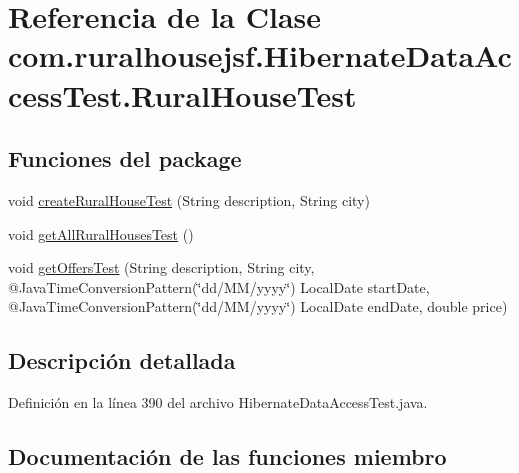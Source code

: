 \hypertarget{classcom_1_1ruralhousejsf_1_1_hibernate_data_access_test_1_1_rural_house_test}{}\section{Referencia de la Clase com.\+ruralhousejsf.\+Hibernate\+Data\+Access\+Test.\+Rural\+House\+Test}
\label{classcom_1_1ruralhousejsf_1_1_hibernate_data_access_test_1_1_rural_house_test}
\subsection*{Funciones del \textquotesingle{}package\textquotesingle{}}
\begin{DoxyCompactItemize}
\item 
void \mbox{\hyperlink{classcom_1_1ruralhousejsf_1_1_hibernate_data_access_test_1_1_rural_house_test_a34ac80f29a8ab5743e37e7f2e78db5e8}{create\+Rural\+House\+Test}} (String description, String city)
\item 
void \mbox{\hyperlink{classcom_1_1ruralhousejsf_1_1_hibernate_data_access_test_1_1_rural_house_test_abe3f39b2ef888c3f2b16d399c3d01f66}{get\+All\+Rural\+Houses\+Test}} ()
\item 
void \mbox{\hyperlink{classcom_1_1ruralhousejsf_1_1_hibernate_data_access_test_1_1_rural_house_test_a1f307f98016263fa520eefc8520ed5d2}{get\+Offers\+Test}} (String description, String city, @Java\+Time\+Conversion\+Pattern(\char`\"{}dd/MM/yyyy\char`\"{}) Local\+Date start\+Date, @Java\+Time\+Conversion\+Pattern(\char`\"{}dd/MM/yyyy\char`\"{}) Local\+Date end\+Date, double price)
\end{DoxyCompactItemize}


\subsection{Descripción detallada}


Definición en la línea 390 del archivo Hibernate\+Data\+Access\+Test.\+java.



\subsection{Documentación de las funciones miembro}
\mbox{\label{classcom_1_1ruralhousejsf_1_1_hibernate_data_access_test_1_1_rural_house_test_a34ac80f29a8ab5743e37e7f2e78db5e8}} 
